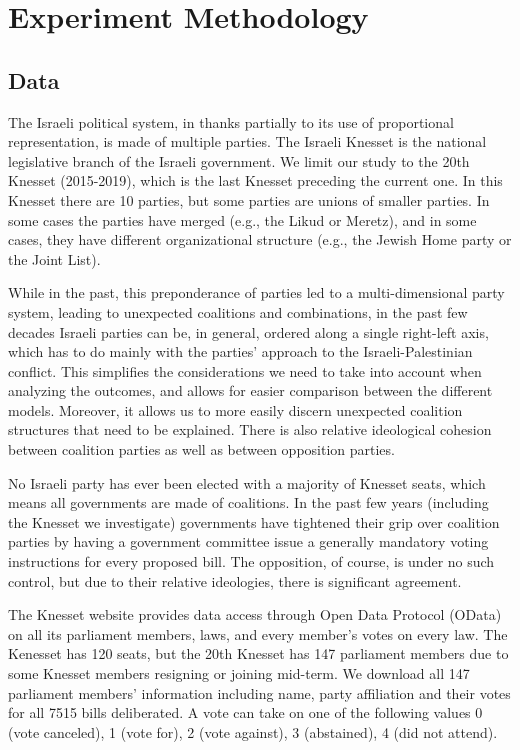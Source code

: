 
\chapter{Experiment Methodology}
\label{ch:experiment}
\vspace{2em}

\section{Data}
\label{sec:data}

The Israeli political system, in thanks partially to its use of
proportional representation, is made of multiple parties.
The Israeli Knesset is the national legislative branch of the Israeli government.
We limit our study to the 20th Knesset (2015-2019), which is the last
Knesset preceding the current one.
In this Knesset there are 10 parties, but some parties are unions of smaller parties.
In some cases the parties have merged (e.g., the Likud or Meretz),
and in some cases, they have different organizational structure
(e.g., the Jewish Home party or the Joint List).

While in the past, this preponderance of parties led to a multi-dimensional
party system, leading to unexpected coalitions and combinations,
in the past few decades Israeli parties can be, in general,
ordered along a single right-left axis, which has to do mainly with
the parties' approach to the Israeli-Palestinian conflict.
This simplifies the considerations we need to take into account when analyzing
the outcomes, and allows for easier comparison between the different models.
Moreover, it allows us to more easily discern
unexpected coalition structures that need to be explained.
There is also relative ideological cohesion between coalition parties
as well as between opposition parties.

No Israeli party has ever been elected with a majority of Knesset seats,
which means all governments are made of coalitions.
In the past few years (including the Knesset we investigate)
governments have tightened their grip over coalition parties
by having a government committee issue a generally mandatory
voting instructions for every proposed bill.
The opposition, of course, is under no such control,
but due to their relative ideologies, there is significant agreement.

The Knesset website provides data access through Open Data Protocol (OData)
on all its parliament members, laws, and every member's votes on every law.
The Kenesset has 120 seats, but the 20th Knesset has 147 parliament members
due to some Knesset members resigning or joining mid-term.
We download all 147 parliament members' information including name,
party affiliation and their votes for all 7515 bills deliberated.
A vote can take on one of the following values
0 (vote canceled), 1 (vote for), 2 (vote against),
3 (abstained), 4 (did not attend).



